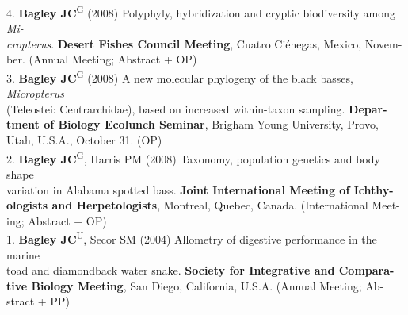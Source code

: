 \documentclass[margin,line]{res}
\begin{document}
\begin{resume}
4. \textbf{Bagley JC}\textsuperscript{G} (2008) Polyphyly, hybridization and cryptic biodiversity among \emph{Mi-}\\
\hspace*{8mm} \emph{cropterus}. \textbf{Desert Fishes Council Meeting}, Cuatro Ci\'{e}negas, Mexico, Novem-\\ \vspace{2mm}
\hspace*{8mm}ber. (Annual Meeting; Abstract + OP) \\
3. \textbf{Bagley JC}\textsuperscript{G} (2008) A new molecular phylogeny of the black basses, \emph{Micropterus}\\
\hspace*{8mm} (Teleostei: Centrarchidae), based on increased within-taxon sampling. \textbf{Depar-}\\
\hspace*{8mm} \textbf{tment of Biology Ecolunch Seminar}, Brigham Young University, Provo,\\ \vspace{2mm}
\hspace*{8mm}Utah, U.S.A., October 31. (OP) \\
2. \textbf{Bagley JC}\textsuperscript{G}, Harris PM (2008) Taxonomy, population genetics and body shape\\
\hspace*{8mm} variation in Alabama spotted bass. \textbf{Joint International Meeting of Ichthy-}\\
\hspace*{8mm} \textbf{ologists and Herpetologists}, Montreal, Quebec, Canada. (International Meet-\\ \vspace{2mm}
\hspace*{8mm}ing; Abstract + OP) \\
1. \textbf{Bagley JC}\textsuperscript{U}, Secor SM (2004) Allometry of digestive performance in the marine\\
\hspace*{8mm} toad and diamondback water snake. \textbf{Society for Integrative and Compara-}\\
\hspace*{8mm} \textbf{tive Biology Meeting}, San Diego, California, U.S.A. (Annual Meeting; Ab- \\ \vspace{2mm}
\hspace*{8mm}stract + PP)




\end{resume}
\end{document}
